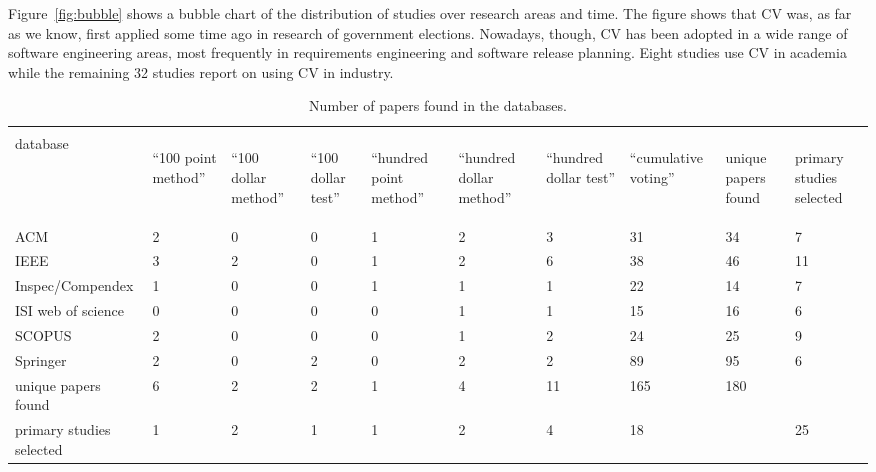 Figure~\ref{fig:bubble} shows a bubble chart of the distribution of studies over research areas and time.
The figure shows that CV was, as far as we know, first applied some time ago in research of government elections.
Nowadays, though, CV has been adopted in a wide range of software engineering areas, most frequently in requirements engineering and software release planning.
Eight studies use CV in academia while the remaining 32 studies report on using CV in industry.
%
\begin{table}
\center
	\scriptsize
\caption{\label{tab:Number-of-papers}Number of papers found in the databases.}

\begin{tabular}{|>{\raggedright}b{}|>{\raggedright}p{}|>{\raggedright}p{}|>{\raggedright}p{}|>{\raggedright}p{}|>{\raggedright}p{}|>{\raggedright}p{}|>{\raggedright}p{}|>{\raggedright}p{}|>{\raggedright}p{}|}
\hline 
 & \multicolumn{7}{l|}{search strings} &  & \tabularnewline
\cline{2-8} 
database & \begin{sideways}
{}``100 point method''%
\end{sideways} & \begin{sideways}
{}``100 dollar method''%
\end{sideways} & \begin{sideways}
{}``100 dollar test''%
\end{sideways} & \begin{sideways}
{}``hundred point method''%
\end{sideways} & \begin{sideways}
{}``hundred dollar method''%
\end{sideways} & \begin{sideways}
{}``hundred dollar test''%
\end{sideways} & \begin{sideways}
{}``cumulative voting''%
\end{sideways} & \begin{sideways}
unique papers found%
\end{sideways} & \begin{sideways}
primary studies selected%
\end{sideways}\tabularnewline
\hline
ACM & 2 & 0 & 0 & 1 & 2 & 3 & 31 & 34 & 7\tabularnewline
\hline 
IEEE & 3 & 2 & 0 & 1 & 2 & 6 & 38 & 46 & 11\tabularnewline
\hline 
Inspec\slash Compendex & 1 & 0 & 0 & 1 & 1 & 1 & 22 & 14 & 7\tabularnewline
\hline 
ISI web of science & 0 & 0 & 0 & 0 & 1 & 1 & 15 & 16 & 6\tabularnewline
\hline 
SCOPUS & 2 & 0 & 0 & 0 & 1 & 2 & 24 & 25 & 9\tabularnewline
\hline 
Springer & 2 & 0 & 2 & 0 & 2 & 2 & 89 & 95 & 6\tabularnewline
\hline 
unique papers found & 6 & 2 & 2 & 1 & 4 & 11 & 165 & 180 & \tabularnewline
\hline 
primary studies selected & 1 & 2 & 1 & 1 & 2 & 4 & 18 &  & 25\tabularnewline
\hline
\end{tabular}%
\end{table}
